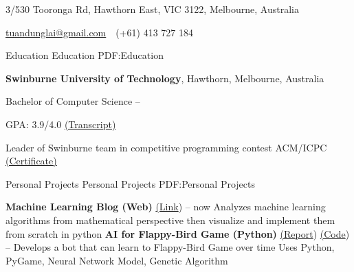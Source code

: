 \documentclass[letterpaper,MMMyyyy,nonstopmode]{simpleresumecv}
\newcommand{\CVAuthor}{Tuan Dung Lai}
\newcommand{\CVWebpage}{dunglai.github.io}
\begin{document}

\Title{\CVAuthor}

\begin{SubTitle}
{3/530 Tooronga Rd, Hawthorn East, VIC 3122, Melbourne, Australia}
\par
\href{mailto:tuandunglai@gmail.com}
{tuandunglai@gmail.com}
\,\SubBulletSymbol\,
(+61) 413 727 184
\,
\end{SubTitle}

\begin{Body}


\Section
{Education}
{Education}
{PDF:Education}

\Entry
{\textbf{Swinburne University of Technology}},
Hawthorn, Melbourne, Australia

\Gap
\BulletItem
Bachelor of Computer Science
\hfill
{} --

\SubBulletItem GPA: 3.9/4.0 
\href{https://dunglai.github.io/public/post-assets/About/AcademicTranscript.pdf}{(\color{blue}Transcript)}

\SubBulletItem Leader of Swinburne team in competitive programming contest ACM/ICPC \href{https://dunglai.github.io/public/post-assets/About/CVLatex/ACMcert.png}{(\color{blue}Certificate)}



\Section
{Personal Projects}
{Personal Projects}
{PDF:Personal Projects}

\BulletItem
\textbf{Machine Learning Blog (Web)} \href{https://dunglai.github.io}{(\color{blue}Link})
\hfill
{} --
now
\SubBulletItem Analyzes machine learning algorithms from mathematical perspective then visualize and implement them from scratch in python
\Gap\Gap\Gap
\BulletItem
\textbf{AI for Flappy-Bird Game (Python)} \href{https://dunglai.github.io/public/post-assets/FlappyBirdAI/report.pdf}{(\color{blue}Report}) \href{https://github.com/DungLai/AI-FlappyBird}{(\color{blue}Code})
\hfill
{} --
\SubBulletItem Develops a bot that can learn to Flappy-Bird Game over time
\SubBulletItem Uses Python, PyGame, Neural Network Model, Genetic Algorithm


\end{Body}
\end{document}
